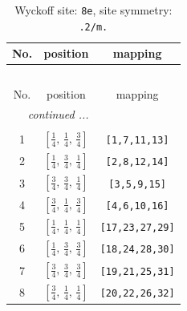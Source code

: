 \documentclass[fleqn,8pt]{jsarticle}
\begin{document}
\begin{longtable}{ccc}
\caption{Wyckoff site: {\tt 8e}, site symmetry: {\tt .2/m.}}
 \\
 \hline \hline
No. & position & mapping \\ \hline \endfirsthead

\multicolumn{2}{l}{\tablename\ \thetable{}} \\
 \hline \hline
No. & position & mapping \\ \hline \endhead

 \hline \hline
\multicolumn{2}{r}{\footnotesize\it continued ...} \\ \endfoot

 \hline \hline
\multicolumn{2}{r}{} \\ \endlastfoot

1 & $\left[ \frac{1}{4},\, \frac{1}{4},\, \frac{3}{4} \right]$ & {\tt [1,7,11,13]} \\ \hline
2 & $\left[ \frac{1}{4},\, \frac{3}{4},\, \frac{1}{4} \right]$ & {\tt [2,8,12,14]} \\ \hline
3 & $\left[ \frac{3}{4},\, \frac{3}{4},\, \frac{1}{4} \right]$ & {\tt [3,5,9,15]} \\ \hline
4 & $\left[ \frac{3}{4},\, \frac{1}{4},\, \frac{3}{4} \right]$ & {\tt [4,6,10,16]} \\ \hline
5 & $\left[ \frac{1}{4},\, \frac{1}{4},\, \frac{1}{4} \right]$ & {\tt [17,23,27,29]} \\ \hline
6 & $\left[ \frac{1}{4},\, \frac{3}{4},\, \frac{3}{4} \right]$ & {\tt [18,24,28,30]} \\ \hline
7 & $\left[ \frac{3}{4},\, \frac{3}{4},\, \frac{3}{4} \right]$ & {\tt [19,21,25,31]} \\ \hline
8 & $\left[ \frac{3}{4},\, \frac{1}{4},\, \frac{1}{4} \right]$ & {\tt [20,22,26,32]} \\
\end{longtable}
\renewcommand{\arraystretch}{1.2}
\end{document}

